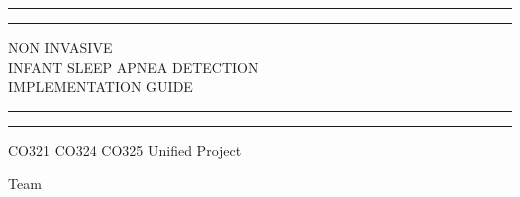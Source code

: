 \documentclass{report}
\begin{document}
\begin{titlepage} %

	\centering %
	
	\scshape %
	
	\vspace*{\baselineskip} %
	
	
	\rule{\textwidth}{1.6pt}\vspace*{-\baselineskip}\vspace*{2pt} %
	\rule{\textwidth}{0.4pt} %
	
	\vspace{1.5\baselineskip} %
	
	{\LARGE NON INVASIVE \\\vspace{5.0pt}INFANT SLEEP APNEA DETECTION \\ \vspace{15.0pt} IMPLEMENTATION GUIDE} %
	
	\vspace{1.5\baselineskip} %
	
	\rule{\textwidth}{0.4pt}\vspace*{-\baselineskip}\vspace{3.2pt} %
	\rule{\textwidth}{1.6pt} %
	
	\vspace{2cm} %
	
	
	CO321 CO324 CO325 Unified Project %
	
	\vspace*{6cm} %
	
	
	Team
	
	\vspace{0.5\baselineskip} %
	

\end{titlepage}
\end{document}
